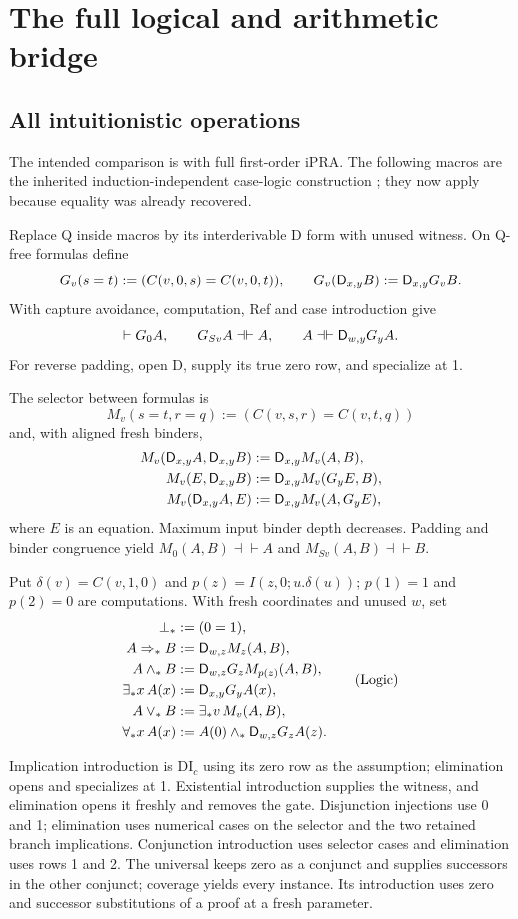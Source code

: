 \section{The full logical and arithmetic bridge}\label{sec:bridge}
\subsection{All intuitionistic operations}\label{sec:choice-introduction}
The intended comparison is with full first-order iPRA. The following
macros are the inherited induction-independent case-logic construction
\cite{choice}; they now apply because equality was already recovered.

Replace Q inside macros by its interderivable D form with unused witness.
On Q-free formulas define
\[
 G_v(s=t):=(C(v,0,s)=C(v,0,t)),\qquad
 G_v(\mathsf D_{x,y}B):=\mathsf D_{x,y}G_vB.
\]
With capture avoidance, computation, Ref and case introduction give
\[
 \vdash G_0A,\qquad G_{Sv}A\dashv\vdash A,\qquad
 A\dashv\vdash\mathsf D_{w,y}G_yA.
\]
For reverse padding, open D, supply its true zero row, and specialize at 1.

The selector between formulas is
\[
 M_v(s=t,r=q):=(C(v,s,r)=C(v,t,q))
\]
and, with aligned fresh binders,
\[
\begin{aligned}
 M_v(\mathsf D_{x,y}A,\mathsf D_{x,y}B)&:=\mathsf D_{x,y}M_v(A,B),\\
 M_v(E,\mathsf D_{x,y}B)&:=\mathsf D_{x,y}M_v(G_yE,B),\\
 M_v(\mathsf D_{x,y}A,E)&:=\mathsf D_{x,y}M_v(A,G_yE),
\end{aligned}
\]
where $E$ is an equation. Maximum input binder depth decreases.
Padding and binder congruence yield
$M_0(A,B)\dashv\vdash A$ and $M_{Sv}(A,B)\dashv\vdash B$.

Put $\delta(v)=C(v,1,0)$ and $p(z)=I(z,0;u.\delta(u))$;
$p(1)=1$ and $p(2)=0$ are computations. With fresh coordinates and unused
$w$, set
\[
\begin{aligned}
 \bot_*&:=(0=1),\\
 A\Rightarrow_*B&:=\mathsf D_{w,z}M_z(A,B),\\
 A\wedge_*B&:=\mathsf D_{w,z}G_zM_{p(z)}(A,B),\\
 \exists_*x\,A(x)&:=\mathsf D_{x,y}G_yA(x),\\
 A\vee_*B&:=\exists_*v\,M_v(A,B),\\
 \forall_*x\,A(x)&:=A(0)\wedge_*\mathsf D_{w,z}G_zA(z).
\end{aligned}                                                   \tag{Logic}
\]

Implication introduction is DI$_c$ using its zero row as the assumption;
elimination opens and specializes at 1. Existential introduction supplies
the witness, and elimination opens it freshly and removes the gate.
Disjunction injections use 0 and 1; elimination uses numerical cases on
the selector and the two retained branch implications.
Conjunction introduction uses selector cases and elimination uses rows
1 and 2. The universal keeps zero as a conjunct and supplies successors
in the other conjunct; coverage yields every instance.
Its introduction uses zero and successor substitutions of a proof at a
fresh parameter.

